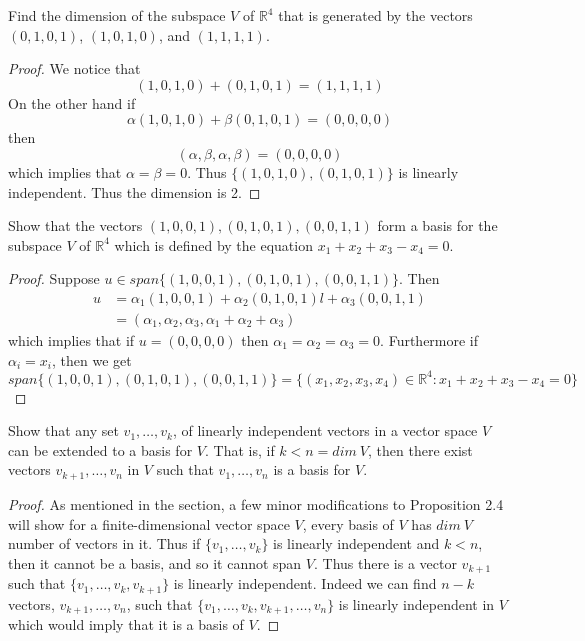     \question Find the dimension of the subspace \( V \) of \( \mathbb{R}^4 \) that is generated by the vectors \( (0,1,0,1) \), \( (1,0,1,0) \), and \( (1,1,1,1) \).
    
    \begin{proof}
        We notice that
        \[
        (1,0,1,0)+(0,1,0,1)=(1,1,1,1)
        \]
        On the other hand if 
        \[
        \alpha(1,0,1,0)+\beta(0,1,0,1) = (0,0,0,0)
        \]
        then
        \[
        (\alpha,\beta,\alpha,\beta) = (0,0,0,0)
        \]
        which implies that \( \alpha=\beta=0 \). Thus \( \{ (1,0,1,0), (0,1,0,1) \} \) is linearly independent. Thus the dimension is 2.
    \end{proof}
    
    \question Show that the vectors \( (1,0,0,1), (0,1,0,1), (0,0,1,1) \) form a basis for the subspace \( V \) of \( \mathbb{R}^4 \) which is defined by the equation \( x_1+x_2+x_3-x_4=0 \).
    
    \begin{proof}
        Suppose \( u \in span\{ (1,0,0,1),(0,1,0,1),(0,0,1,1) \} \). Then
        \begin{align*}
            u &= \alpha_1(1,0,0,1)+\alpha_2(0,1,0,1)l+\alpha_3(0,0,1,1) \\
            &= (\alpha_1,\alpha_2,\alpha_3,\alpha_1+\alpha_2+\alpha_3)
        \end{align*}
        which implies that if \( u = (0,0,0,0) \) then \( \alpha_1=\alpha_2=\alpha_3 = 0 \). Furthermore if \( \alpha_i = x_i \), then we get
        \[
        span\{ (1,0,0,1),(0,1,0,1),(0,0,1,1) \} = \{ (x_1,x_2,x_3,x_4)\in \mathbb{R}^4: x_1+x_2+x_3-x_4=0 \}
        \]
    \end{proof}
    
    \question Show that any set \( v_1,\ldots, v_k \), of linearly independent vectors in a vector space \( V \) can be extended to a basis for \( V \). That is, if \( k < n = dim\:V \), then there exist vectors \( v_{k+1},\ldots,v_n \) in \( V \) such that \( v_1,\ldots,v_n \) is a basis for \( V \).
    
    \begin{proof}
        As mentioned in the section, a few minor modifications to Proposition 2.4 will show for a finite-dimensional vector space \( V \), every basis of \( V \) has \( dim\:V \) number of vectors in it. Thus if \( \{ v_1,\ldots,v_k \} \) is linearly independent and \( k < n \), then it cannot be a basis, and so it cannot span \( V \). Thus there is a vector \( v_{k+1} \) such that \( \{ v_1,\ldots,v_k,v_{k+1} \} \) is linearly independent. Indeed we can find \( n-k \) vectors, \( v_{k+1}, \ldots, v_{n} \), such that \( \{ v_1,\ldots,v_k,v_{k+1},\ldots,v_n \} \) is linearly independent in \( V \) which would imply that it is a basis of \( V \).
    \end{proof}